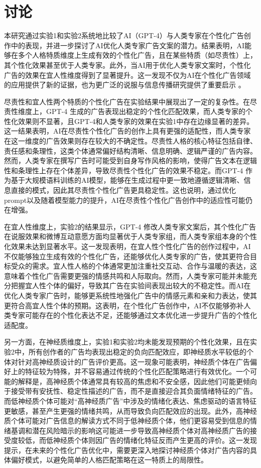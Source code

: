 \section{讨论}

本研究通过实验1和实验2系统地比较了AI（GPT-4）与人类专家在个性化广告创作中的表现，并进一步探讨了AI优化人类专家广告文案的潜力。结果表明，AI能够在多个人格特质维度上生成有效的个性化广告，且在某些特质（如尽责性）上，其个性化效果甚至优于人类专家。此外，当AI用于优化人类专家文案时，个性化广告的效果在宜人性维度得到了显著提升。这一发现不仅为AI在个性化广告领域的应用提供了新的证据，也为更广泛的说服与信息传播研究提供了重要启示 \citep{dehnert2022persuasion}。

尽责性和宜人性两个特质的个性化广告在实验结果中展现出了一定的复杂性。在尽责性维度上，GPT-4 生成的广告表现出稳定的个性化匹配效果，而人类专家的个性化效果则不显著，且GPT-4和人类专家的效果在实验1中存在边缘显著的差异。这一结果表明，AI在尽责性个性化广告的创作上具有更强的适配性，而人类专家在这一维度的广告效果则存在较大的不确定性。尽责性人格的核心特征包括自律、责任感和条理性\citep{roberts2014conscientiousness}，这类个体通常偏好结构清晰、信息明确、逻辑严谨的广告内容。然而，人类专家在撰写广告时可能受到自身写作风格的影响，使得广告文本在逻辑性和条理性上存在个体差异，导致尽责性个性化广告的效果不稳定。而GPT-4 作为基于大规模语料训练的AI模型，能够在生成过程中更一致地遵循逻辑清晰、信息直接的模式，因此其尽责性个性化广告更具稳定性。这也说明，通过优化prompt以及随着模型能力的提升，AI在尽责性个性化广告创作中的适应性可能仍在增强。

在宜人性维度上，实验2的结果显示，GPT-4 修改人类专家文案后，其个性化广告在说服效果和微博互动意愿方面均显著优于人类专家组，而人类专家组本身的个性化效果未达到显著水平。这一发现表明，在宜人性个性化广告的创作过程中，AI不仅能够独立生成有效的个性化广告，还能够优化人类专家的广告，使其更符合目标受众的需求。宜人性人格的个体通常更加注重社交互动、合作与温暖的表达\citep{graziano2007agreeableness}，这意味着个性化广告需要更强的情感共鸣和人际取向。然而，人类专家可能并未能充分把握宜人性个体的偏好，导致其广告在实验间表现出较大的不稳定性。而AI在优化人类专家广告时，能够更系统性地强化广告中的情感元素和亲和力表达，使其更符合高宜人性个体的预期。这表明，在个性化广告创作中，AI不仅能够弥补人类专家可能存在的个性化表达不足，还能够通过文本优化进一步提升广告的个性化适配度。

另一方面，在神经质维度上，实验1和实验2均未能发现预期的个性化效果，且在实验2中，所有创作者的广告均表现出稳定的负向匹配效应，即神经质水平较低的个体对针对高神经质设计的广告评价更高。这一现象可能表明，神经质个体在广告偏好上的特征较为特殊，并不容易通过传统的个性化匹配策略进行有效优化。一个可能的解释是，高神经质个体通常具有较高的焦虑和不安全感，因此他们可能更倾向于接受带有安抚性、稳定性描述的广告，而不是直接迎合其负面情绪特征的广告。而低神经质个体可能对“高神经质广告”中涉及的情绪化表达、焦虑驱动的语言特征更敏感，甚至产生更强的情绪共鸣，从而导致负向匹配效应的出现。此外，高神经质个体可能对广告信息的解读方式不同于低神经质个体，他们更容易受到信息的情绪基调和潜在风险暗示的影响这可能进一步导致高神经质个体对高神经质广告的接受度较低，而低神经质个体则因广告的情绪化特征反而产生更高的评价。这一发现提示，在未来的个性化广告优化中，需要更深入地探讨神经质个体对广告内容的具体偏好模式，以避免简单的人格匹配策略在这一特质上的局限性。

